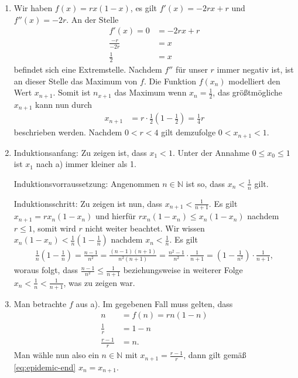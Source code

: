 \documentclass{article}
\begin{document}
\begin{enumerate}
    \item Wir haben $f(x) = rx(1 - x)$, es gilt $f'(x) = -2rx + r$ und $f''(x) = -2r$. An der Stelle
    \begin{align*}
        f'(x) = 0 &= -2rx + r \\
        \frac{-r}{-2r} &= x \\
        \frac{1}{2} &= x
    \end{align*}
    befindet sich eine Extremstelle. Nachdem $f''$ f\"ur unser $r$ immer negativ ist, ist an dieser Stelle das Maximum von $f$. Die Funktion $f(x_{n})$ modelliert den Wert $x_{n + 1}$. Somit ist $n_{x + 1}$ das Maximum wenn $x_n = \frac{1}{2}$, das größtmögliche $x_{n + 1}$ kann nun durch 
    \begin{align*}
        x_{n + 1} &= r \cdot \frac{1}{2}\left(1 - \frac{1}{2}\right) = \frac{1}{4}r
    \end{align*}
    beschrieben werden. Nachdem $0 < r < 4$ gilt demzufolge $0 < x_{n + 1} < 1$.

    \item Induktionsanfang: Zu zeigen ist, dass $x_1 < 1$. Unter der Annahme $0 \leq x_0 \leq 1$ ist $x_1$ nach a) immer kleiner als 1.
    
    Induktionsvorraussetzung: Angenommen $n \in \mathbb{N}$ ist so, dass $x_n < \frac{1}{n}$ gilt.

    Induktionsschritt: Zu zeigen ist nun, dass $x_{n + 1} < \frac{1}{n + 1}$. Es gilt $x_{n + 1} = r x_{n} (1 - x_{n})$ und hierf\"ur $r x_{n} (1 - x_{n}) \leq x_{n} (1 - x_{n})$ nachdem $r \leq 1$, somit wird $r$ nicht weiter beachtet. Wir wissen $x_{n} (1 - x_{n}) < \frac{1}{n} (1 - \frac{1}{n})$ nachdem $x_n < \frac{1}{n}$. Es gilt
    \begin{align*}
        \frac{1}{n} (1 - \frac{1}{n}) = \frac{n - 1}{n^2} = \frac{(n - 1)(n + 1)}{n^2(n + 1)} = \frac{n^2 - 1}{n^2} \cdot \frac{1}{n + 1} = \left(1 - \frac{1}{n^2}\right) \cdot \frac{1}{n + 1},
    \end{align*}
    woraus folgt, dass $\frac{n - 1}{n^2} \leq \frac{1}{n + 1}$ beziehungsweise in weiterer Folge $x_n < \frac{1}{n} < \frac{1}{n + 1}$, was zu zeigen war.
    
    \item Man betrachte $f$ aus a). Im gegebenen Fall muss gelten, dass
    \begin{equation}\label{eq:epidemic-end}
        \begin{aligned}            
        n &= f(n) = rn(1 - n) \\
        \frac{1}{r} &= 1 - n \\
        \frac{r - 1}{r} &= n.
        \end{aligned}
    \end{equation}
    Man w\"ahle nun also ein $n \in \mathbb{N}$ mit $x_{n + 1} = \frac{r - 1}{r}$, dann gilt gem\"a{\ss} \eqref{eq:epidemic-end} $x_n = x_{n + 1}$.
\end{enumerate}
\end{document}
